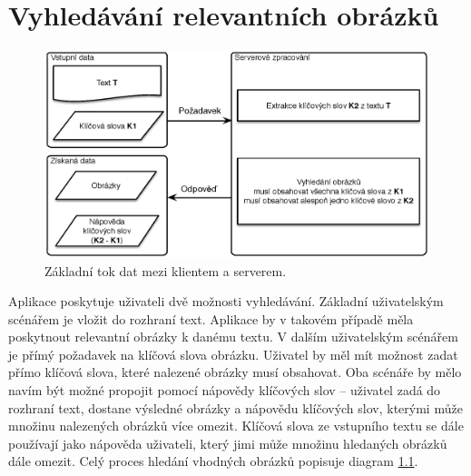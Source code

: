 \chapter{Vyhledávání relevantních obrázků}





\begin{figure}[h]
  \centering
  \includegraphics[width=150mm]{dataflow.eps}
  \caption{Základní tok dat mezi klientem a serverem.}
  \label{fig:dataflow}
\end{figure}


Aplikace poskytuje uživateli dvě možnosti vyhledávání. Základní uživatelským scénářem je vložit do rozhraní text. Aplikace by v takovém případě měla poskytnout relevantní obrázky k danému textu. V dalším uživatelským scénářem je přímý požadavek na klíčová slova obrázku. Uživatel by měl mít možnost zadat přímo klíčová slova, které nalezené obrázky musí obsahovat. Oba scénáře by mělo navím být možné propojit pomocí nápovědy klíčových slov -- uživatel zadá do rozhraní text, dostane výsledné obrázky a nápovědu klíčových slov, kterými může množinu nalezených obrázků více omezit. Klíčová slova ze vstupního textu se dále používají jako nápověda uživateli, který jimi může množinu hledaných obrázků dále omezit. Celý proces hledání vhodných obrázků popisuje diagram \ref{fig:dataflow}.

